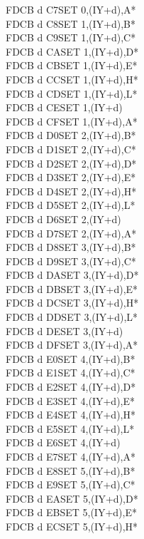 \documentclass[oneside,a4paper]{book}
\begin{document}
\begin{multicols}{3}
{\begin{tabbing}
FDCB d C7\>SET 0,(IY+d),A*\\
FDCB d C8\>SET 1,(IY+d),B*\\
FDCB d C9\>SET 1,(IY+d),C*\\
FDCB d CA\>SET 1,(IY+d),D*\\
FDCB d CB\>SET 1,(IY+d),E*\\
FDCB d CC\>SET 1,(IY+d),H*\\
FDCB d CD\>SET 1,(IY+d),L*\\
FDCB d CE\>SET 1,(IY+d)\\
FDCB d CF\>SET 1,(IY+d),A*\\
FDCB d D0\>SET 2,(IY+d),B*\\
FDCB d D1\>SET 2,(IY+d),C*\\
FDCB d D2\>SET 2,(IY+d),D*\\
FDCB d D3\>SET 2,(IY+d),E*\\
FDCB d D4\>SET 2,(IY+d),H*\\
FDCB d D5\>SET 2,(IY+d),L*\\
FDCB d D6\>SET 2,(IY+d)\\
FDCB d D7\>SET 2,(IY+d),A*\\
FDCB d D8\>SET 3,(IY+d),B*\\
FDCB d D9\>SET 3,(IY+d),C*\\
FDCB d DA\>SET 3,(IY+d),D*\\
FDCB d DB\>SET 3,(IY+d),E*\\
FDCB d DC\>SET 3,(IY+d),H*\\
FDCB d DD\>SET 3,(IY+d),L*\\
FDCB d DE\>SET 3,(IY+d)\\
FDCB d DF\>SET 3,(IY+d),A*\\
FDCB d E0\>SET 4,(IY+d),B*\\
FDCB d E1\>SET 4,(IY+d),C*\\
FDCB d E2\>SET 4,(IY+d),D*\\
FDCB d E3\>SET 4,(IY+d),E*\\
FDCB d E4\>SET 4,(IY+d),H*\\
FDCB d E5\>SET 4,(IY+d),L*\\
FDCB d E6\>SET 4,(IY+d)\\
FDCB d E7\>SET 4,(IY+d),A*\\
FDCB d E8\>SET 5,(IY+d),B*\\
FDCB d E9\>SET 5,(IY+d),C*\\
FDCB d EA\>SET 5,(IY+d),D*\\
FDCB d EB\>SET 5,(IY+d),E*\\
FDCB d EC\>SET 5,(IY+d),H*\\

\end{tabbing}}
\end{multicols}
\end{document}
